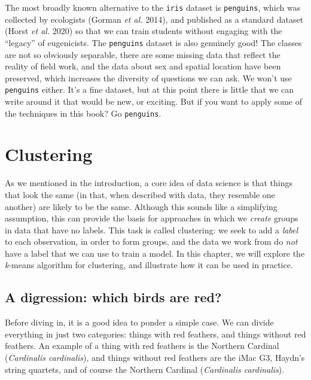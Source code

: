 \documentclass[
  letterpaper,
]{scrbook}
\begin{document}
The most broadly known alternative to the \texttt{iris} dataset is
\texttt{penguins}, which was collected by ecologists (Gorman \emph{et
al.} 2014), and published as a standard dataset (Horst \emph{et al.}
2020) so that we can train students without engaging with the ``legacy''
of eugenicists. The \texttt{penguins} dataset is also genuinely good!
The classes are not so obviously separable, there are some missing data
that reflect the reality of field work, and the data about sex and
spatial location have been preserved, which increases the diversity of
questions we can ask. We won't use \texttt{penguins} either. It's a fine
dataset, but at this point there is little that we can write around it
that would be new, or exciting. But if you want to apply some of the
techniques in this book? Go \texttt{penguins}.


\chapter{Clustering}\label{sec-clustering}

As we mentioned in the introduction, a core idea of data science is that
things that look the same (in that, when described with data, they
resemble one another) are likely to be the same. Although this sounds
like a simplifying assumption, this can provide the basis for approaches
in which we \emph{create} groups in data that have no labels. This task
is called clustering: we seek to add a \emph{label} to each observation,
in order to form groups, and the data we work from do \emph{not} have a
label that we can use to train a model. In this chapter, we will explore
the \emph{k}-means algorithm for clustering, and illustrate how it can
be used in practice.

\section{A digression: which birds are
red?}\label{a-digression-which-birds-are-red}

Before diving in, it is a good idea to ponder a simple case. We can
divide everything in just two categories: things with red feathers, and
things without red feathers. An example of a thing with red feathers is
the Northern Cardinal (\emph{Cardinalis cardinalis}), and things without
red feathers are the iMac G3, Haydn's string quartets, and of course the
Northern Cardinal (\emph{Cardinalis cardinalis}).
\end{document}
